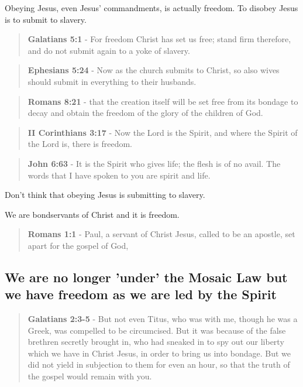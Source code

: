 \documentclass[11pt]{article}
\begin{document}
Obeying Jesus, even Jesus' commandments, is actually freedom. To disobey Jesus is to submit to slavery.

\begin{quote}
\textbf{Galatians 5:1} - For freedom Christ has set us free; stand firm therefore, and do not submit again to a yoke of slavery.
\end{quote}

\begin{quote}
\textbf{Ephesians 5:24} - Now as the church submits to Christ, so also wives should submit in everything to their husbands.
\end{quote}

\begin{quote}
\textbf{Romans 8:21} - that the creation itself will be set free from its bondage to decay and obtain the freedom of the glory of the children of God.
\end{quote}

\begin{quote}
\textbf{II Corinthians 3:17} - Now the Lord is the Spirit, and where the Spirit of the Lord is, there is freedom.
\end{quote}

\begin{quote}
\textbf{John 6:63} - It is the Spirit who gives life; the flesh is of no avail. The words that I have spoken to you are spirit and life.
\end{quote}

Don't think that obeying Jesus is submitting to slavery.

We are bondservants of Christ and it is freedom.

\begin{quote}
\textbf{Romans 1:1} - Paul, a servant of Christ Jesus, called to be an apostle, set apart for the gospel of God,
\end{quote}

\subsection{We are no longer 'under' the Mosaic Law but we have freedom as we are led by the Spirit}
\label{sec:orgc225418}

\begin{quote}
\textbf{Galatians 2:3-5} - But not even Titus, who was with me, though he was a Greek, was compelled to be circumcised. But it was because of the false brethren secretly brought in, who had sneaked in to spy out our liberty which we have in Christ Jesus, in order to bring us into bondage. But we did not yield in subjection to them for even an hour, so that the truth of the gospel would remain with you.
\end{quote}
\end{document}

